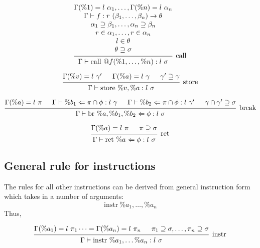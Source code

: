 \documentclass{article}
\begin{document}
\[
\begin{prooftree}
    \hypo{
        \begin{matrix}
        \Gamma(\%1) = l\ \alpha_1, \dots, \Gamma(\%n) = l\ \alpha_n \\
        \Gamma \vdash f : r\ (\beta_1, \dots, \beta_n) \rightarrow \theta \\ 
        \alpha_1 \supseteq \beta_1, \dots, \alpha_n \supseteq \beta_n \\
        r \in \alpha_1, \dots, r \in \alpha_n \\
        l \in \theta \\
        \theta \supseteq \sigma 
        \end{matrix}
    }
    \infer1[call]{\Gamma \vdash \text{call } @f(\%1, \dots, \%n) : l\ \sigma}
\end{prooftree}
\]

\[
\begin{prooftree}
    \hypo{\Gamma(\%v) = l\ \gamma'}
    \hypo{\Gamma(\%a) = l\ \gamma}
    \hypo{\gamma' \supseteq \gamma}
    \infer3[store]{\Gamma \vdash \text{store }\%v, \%a : l\ \sigma}
\end{prooftree}
\]

\[
\begin{prooftree}
    \hypo{\Gamma(\%a) = l\ \pi}
    \hypo{\Gamma \vdash \%b_1 \Leftarrow \pi \cap \phi : l\ \gamma} 
    \hypo{\Gamma \vdash \%b_2 \Leftarrow \pi \cap \phi : l\ \gamma'} 
    \hypo{\gamma \cap \gamma' \supseteq \sigma}
    \infer4[break]{\Gamma \vdash \text{br }\%a, \%b_1, \%b_2 \Leftarrow \phi : l\ \sigma}
\end{prooftree}
\]




\[
\begin{prooftree}
    \hypo{\Gamma(\%a) = l\ \pi}
    \hypo{\pi \supseteq \sigma}
    \infer2[ret]{\Gamma \vdash \text{ret }\%a \Leftarrow \phi : l\ \sigma}
\end{prooftree}
\]

\subsection{General rule for instructions}

The rules for all other instructions
can be derived from general instruction form which takes in
a number of arguments:
$$\text{instr}\ \%a_1, \dots, \%a_n$$
Thus,

\[
\begin{prooftree}
    \hypo{\Gamma(\%a_1) = l\ \pi_1 \dots = \Gamma(\%a_n) = l\ \pi_n}
    \hypo{\pi_1 \supseteq \sigma, \dots, \pi_n \supseteq \sigma}
    \infer2[instr]{\Gamma \vdash \text{instr}\ \%a_1, \dots \%a_n : l\ \sigma}
\end{prooftree}
\]
\end{document}
